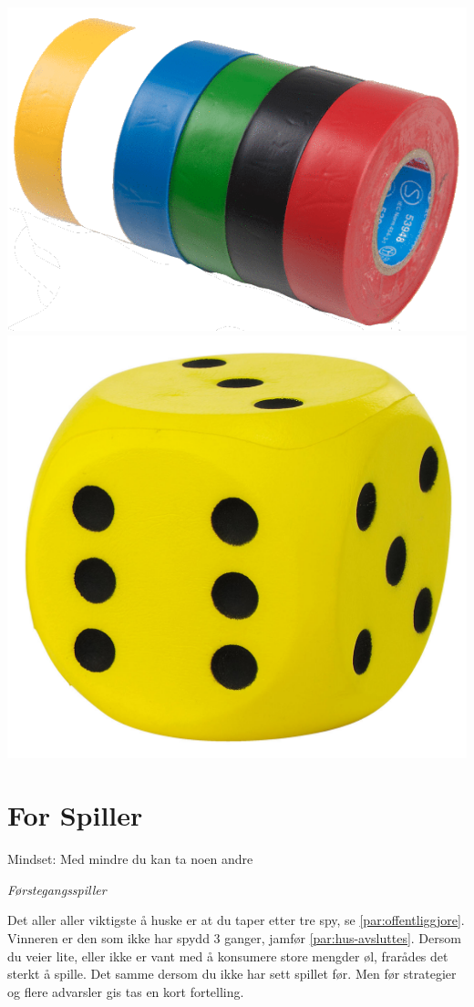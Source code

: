 \documentclass[10pt,a4paper,norsk,openany]{book}
\begin{document}
\includegraphics[scale=0.2]{sportstape.png}
\includegraphics[scale=0.2]{terning.jpg}


\chapter{For Spiller}

\epigraph{Mindset:  Med mindre du kan ta
  noen andre}{\textit{Førstegangsspiller}}

Det aller aller viktigste å huske er at du taper etter tre spy, se
\cref{par:offentliggjore}. Vinneren er den som ikke har spydd 3 ganger, jamfør
\cref{par:hus-avsluttes}. Dersom du veier lite, eller ikke er vant med å
konsumere store mengder øl, frarådes det sterkt å spille. Det samme dersom du
ikke har sett spillet før. Men før strategier og flere advarsler gis tas en kort
fortelling.
\end{document}
